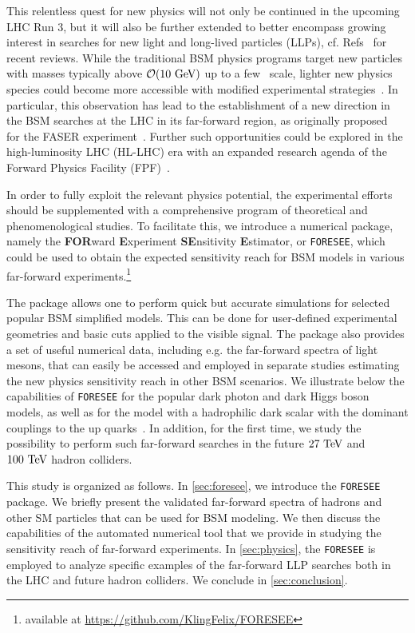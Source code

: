 \documentclass[prd,twocolumn,reprint,preprintnumbers,nofootinbib]{revtex4-1}
\begin{document}
This relentless quest for new physics will not only be continued in the upcoming LHC Run 3, but it will also be further extended to better encompass growing interest in searches for new light and long-lived particles (LLPs), cf. Refs~\cite{Beacham:2019nyx,Agrawal:2021dbo} for recent reviews. While the traditional BSM physics programs target new particles with masses typically above $\mathcal{O}(10~\text{GeV})$ up to a few \tev\ scale, lighter new physics species could become more accessible with modified experimental strategies~\cite{Alimena:2019zri}. In particular, this observation has lead to the establishment of a new direction in the BSM searches at the LHC in its far-forward region, as originally proposed~\cite{Feng:2017uoz,Feng:2017vli,Kling:2018wct,Feng:2018noy} for the FASER experiment~\cite{Ariga:2018zuc,Ariga:2018uku,Ariga:2018pin}. Further such opportunities could be explored in the high-luminosity LHC (HL-LHC) era with an expanded research agenda of the Forward Physics Facility (FPF)~\cite{SnowmassFPF}. 

In order to fully exploit the relevant physics potential, the experimental efforts should be supplemented with a comprehensive program of theoretical and phenomenological studies. To facilitate this, we introduce a numerical package, namely the \textbf{FOR}ward \textbf{E}xperiment \textbf{SE}nsitivity \textbf{E}stimator, or \texttt{FORESEE}, which could be used to obtain the expected sensitivity reach for BSM models in various far-forward experiments.\footnote{available at \href{https://github.com/KlingFelix/FORESEE}{https://github.com/KlingFelix/FORESEE}}

The package allows one to perform quick but accurate simulations for selected popular BSM simplified models. This can be done for user-defined experimental geometries and basic cuts applied to the visible signal. The package also provides a set of useful numerical data, including e.g. the far-forward spectra of light mesons, that can easily be accessed and employed in separate studies estimating the new physics sensitivity reach in other BSM scenarios. We illustrate below the capabilities of \texttt{FORESEE} for the popular dark photon and dark Higgs boson models, as well as for the model with a hadrophilic dark scalar with the dominant couplings to the up quarks~\cite{Batell:2017kty,Batell:2018fqo}. In addition, for the first time, we study the possibility to perform such far-forward searches in the future $27~\text{TeV}$ and $100~\text{TeV}$ hadron colliders.

This study is organized as follows. In \cref{sec:foresee}, we introduce the \texttt{FORESEE} package. We briefly present the validated far-forward spectra of hadrons and other SM particles that can be used for BSM modeling. We then discuss the capabilities of the automated numerical tool that we provide in studying the sensitivity reach of far-forward experiments. In \cref{sec:physics}, the \texttt{FORESEE} is employed to analyze specific examples of the far-forward LLP searches both in the LHC and future hadron colliders. We conclude in \cref{sec:conclusion}.
\end{document}

